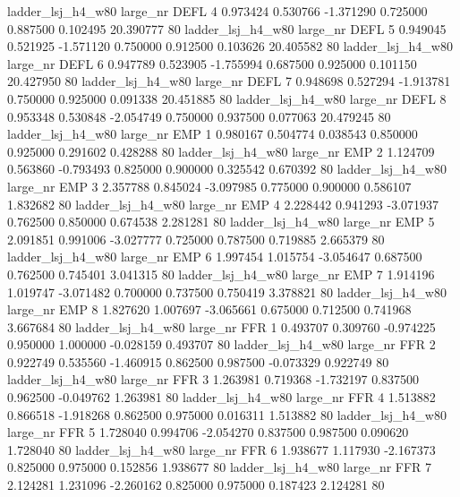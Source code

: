   ladder_lsj_h4_w80   large_nr     DEFL                 4  0.973424  0.530766  -1.371290 0.725000 0.887500  0.102495   20.390777 80
  ladder_lsj_h4_w80   large_nr     DEFL                 5  0.949045  0.521925  -1.571120 0.750000 0.912500  0.103626   20.405582 80
  ladder_lsj_h4_w80   large_nr     DEFL                 6  0.947789  0.523905  -1.755994 0.687500 0.925000  0.101150   20.427950 80
  ladder_lsj_h4_w80   large_nr     DEFL                 7  0.948698  0.527294  -1.913781 0.750000 0.925000  0.091338   20.451885 80
  ladder_lsj_h4_w80   large_nr     DEFL                 8  0.953348  0.530848  -2.054749 0.750000 0.937500  0.077063   20.479245 80
  ladder_lsj_h4_w80   large_nr      EMP                 1  0.980167  0.504774   0.038543 0.850000 0.925000  0.291602    0.428288 80
  ladder_lsj_h4_w80   large_nr      EMP                 2  1.124709  0.563860  -0.793493 0.825000 0.900000  0.325542    0.670392 80
  ladder_lsj_h4_w80   large_nr      EMP                 3  2.357788  0.845024  -3.097985 0.775000 0.900000  0.586107    1.832682 80
  ladder_lsj_h4_w80   large_nr      EMP                 4  2.228442  0.941293  -3.071937 0.762500 0.850000  0.674538    2.281281 80
  ladder_lsj_h4_w80   large_nr      EMP                 5  2.091851  0.991006  -3.027777 0.725000 0.787500  0.719885    2.665379 80
  ladder_lsj_h4_w80   large_nr      EMP                 6  1.997454  1.015754  -3.054647 0.687500 0.762500  0.745401    3.041315 80
  ladder_lsj_h4_w80   large_nr      EMP                 7  1.914196  1.019747  -3.071482 0.700000 0.737500  0.750419    3.378821 80
  ladder_lsj_h4_w80   large_nr      EMP                 8  1.827620  1.007697  -3.065661 0.675000 0.712500  0.741968    3.667684 80
  ladder_lsj_h4_w80   large_nr      FFR                 1  0.493707  0.309760  -0.974225 0.950000 1.000000 -0.028159    0.493707 80
  ladder_lsj_h4_w80   large_nr      FFR                 2  0.922749  0.535560  -1.460915 0.862500 0.987500 -0.073329    0.922749 80
  ladder_lsj_h4_w80   large_nr      FFR                 3  1.263981  0.719368  -1.732197 0.837500 0.962500 -0.049762    1.263981 80
  ladder_lsj_h4_w80   large_nr      FFR                 4  1.513882  0.866518  -1.918268 0.862500 0.975000  0.016311    1.513882 80
  ladder_lsj_h4_w80   large_nr      FFR                 5  1.728040  0.994706  -2.054270 0.837500 0.987500  0.090620    1.728040 80
  ladder_lsj_h4_w80   large_nr      FFR                 6  1.938677  1.117930  -2.167373 0.825000 0.975000  0.152856    1.938677 80
  ladder_lsj_h4_w80   large_nr      FFR                 7  2.124281  1.231096  -2.260162 0.825000 0.975000  0.187423    2.124281 80
